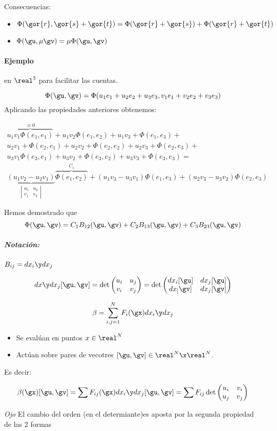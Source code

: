 Consecuencias:

\begin{itemize}
\item $\Phi(\gor{r}, \gor{s}+\gor{t}) = \Phi(\gor{r}+\gor{s}) + \Phi(\gor{r}+\gor{t})$
\item $\Phi(\gu,\mu\gv) = \mu\Phi(\gu,\gv)$
\end{itemize}


\paragraph{Ejemplo} en $\real^3$ para facilitar las cuentas.

\[\Phi(\gu,\gv) = \Phi(u_1e_1+u_2e_2+u_3e_3,v_1e_1+v_2e_2+v_3e_3)\]
Aplicando las propiedades anteriores obtenemos:

\begin{gather*}
\overbrace{u_1v_1\Phi(e_1,e_1)}^{\equiv 0} + u_1v_2\Phi(e_1,e_2) + u_1v_3+\Phi(e_1,e_3)+\\
u_2v_1+\Phi(e_2,e_1)+u_2v_2+\Phi(e_2,e_2)+u_2v_3+\Phi(e_2,e_3)+\\
u_3v_1\Phi(e_3,e_1)+u_3v_2+\Phi(e_3,e_2)+u_3v_3+\Phi(e_3,e_3) = \\
\underbrace{(u_1v_2-u_2v_1)}_{\left|\begin{matrix}
u_1&u_2\\v_1&v_2
\end{matrix}\right|}\overbrace{\Phi(e_1,e_2)}^{C_1}+(u_1v_3-u_3v_1)\Phi(e_1,e_3)+(u_2v_3-u_3v_2)\Phi(e_2,e_3)
\end{gather*}

Hemos demostrado que \[\Phi(\gu,\gv) = C_1B_{12}(\gu,\gv) + C_2B_{13}(\gu,\gv) + C_3B_{23}(\gu,\gv)\]

\subparagraph{Notación:} $B_{ij} = dx_i\y dx_j$

\[dx\y dx_j [\gu,\gv] = \det \begin{pmatrix}
u_i&u_j\\v_i&v_j
\end{pmatrix} = \det \begin{pmatrix}
dx_i[\gu]&dx_j[\gu]\\dx_[\gv]&dx_j[\gv]
\end{pmatrix}\]

\begin{defn}[2-forma]
\[\beta = \sum_{i,j=1}^N F_i(\gx) dx_i\y dx_j\]
\begin{itemize}
\item Se evalúan en puntos $x\in\real^N$
\item Actúan sobre pares de vecotres $[\gu,\gv]\in\real^N\x\real^N$.
\end{itemize}

Es decir:

\[\beta(\gx)[\gu,\gv] = \sum F_{ij}(\gx) dx_i\y dx_j[\gu,\gv] = \sum F_{ij} \det \begin{pmatrix}
u_i&v_i\\u_j&v_j
\end{pmatrix}\]

\emph{Ojo} El cambio del orden (en el determiante)es aposta por la segunda propiedad de las 2 formas
\end{defn}


